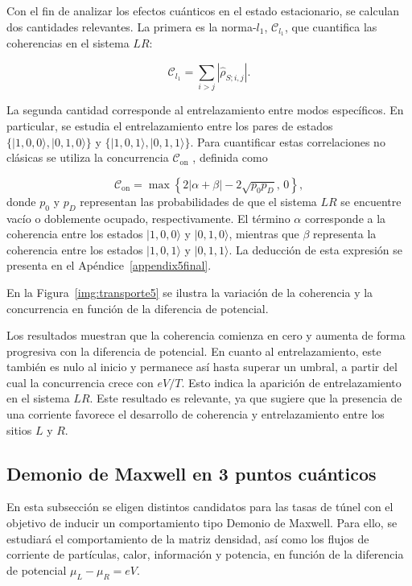 Con el fin de analizar los efectos cuánticos en el estado estacionario, se calculan dos cantidades relevantes. La primera es la norma-$l_{1}$, $\mathcal{C}_{l_{1}}$, que cuantifica las coherencias en el sistema $LR$:  

\[
\mathcal{C}_{l_{1}} = \sum_{i> j} |\hat{\rho}_{S;i,j}|.
\]

La segunda cantidad corresponde al entrelazamiento entre modos específicos. En particular, se estudia el entrelazamiento entre los pares de estados $\{|1,0,0\rangle, |0,1,0\rangle\}$ y $\{|1,0,1\rangle, |0,1,1\rangle\}$. Para cuantificar estas correlaciones no clásicas se utiliza la concurrencia $\mathcal{C}_{\text{on}}$ \cite{hill1997entanglement, wootters1998entanglement}, definida como  

\[
\mathcal{C}_{\text{on}} = \max \left\{ 2|\alpha + \beta| - 2\sqrt{p_0 p_D},\, 0 \right\},
\]
donde $p_0$ y $p_D$ representan las probabilidades de que el sistema $LR$ se encuentre vacío o doblemente ocupado, respectivamente. El término $\alpha$ corresponde a la coherencia entre los estados $|1,0,0\rangle$ y $|0,1,0\rangle$, mientras que $\beta$ representa la coherencia entre los estados $|1,0,1\rangle$ y $|0,1,1\rangle$. La deducción de esta expresión se presenta en el Apéndice~\ref{appendix5final}.  

En la Figura~\ref{img:transporte5} se ilustra la variación de la coherencia y la concurrencia en función de la diferencia de potencial.  

    
Los resultados muestran que la coherencia comienza en cero y aumenta de forma progresiva con la diferencia de potencial. En cuanto al entrelazamiento, este también es nulo al inicio y permanece así hasta superar un umbral, a partir del cual la concurrencia crece con $eV/T$. Esto indica la aparición de entrelazamiento en el sistema $LR$. Este resultado es relevante, ya que sugiere que la presencia de una corriente favorece el desarrollo de coherencia y entrelazamiento entre los sitios $L$ y $R$.  

\label{sec5:transporte}



\subsection{Demonio de Maxwell en 3 puntos cuánticos}
En esta subsección se eligen distintos candidatos para las tasas de túnel con el objetivo de inducir un comportamiento tipo Demonio de Maxwell. Para ello, se estudiará el comportamiento de la matriz densidad, así como los flujos de corriente de partículas, calor, información y potencia, en función de la diferencia de potencial $\mu_{L} - \mu_{R} = eV$.

